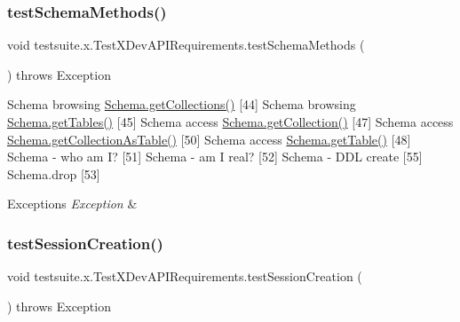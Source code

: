 \subsubsection{\texorpdfstring{test\+Schema\+Methods()}{testSchemaMethods()}}
{\footnotesize\ttfamily void testsuite.\+x.\+Test\+X\+Dev\+A\+P\+I\+Requirements.\+test\+Schema\+Methods (\begin{DoxyParamCaption}{ }\end{DoxyParamCaption}) throws Exception}

Schema browsing \mbox{\hyperlink{interfacecom_1_1mysql_1_1cj_1_1xdevapi_1_1_schema_a644344cb0eaa8ea239f7b82443c487ec}{Schema.\+get\+Collections()}} \mbox{[}44\mbox{]} Schema browsing \mbox{\hyperlink{interfacecom_1_1mysql_1_1cj_1_1xdevapi_1_1_schema_a33149bd057a049634d070e97848b8ca1}{Schema.\+get\+Tables()}} \mbox{[}45\mbox{]} Schema access \mbox{\hyperlink{interfacecom_1_1mysql_1_1cj_1_1xdevapi_1_1_schema_aeb2f782db94fd4a068b1c1e6b9f3f20e}{Schema.\+get\+Collection()}} \mbox{[}47\mbox{]} Schema access \mbox{\hyperlink{interfacecom_1_1mysql_1_1cj_1_1xdevapi_1_1_schema_adaa1920ec971a87acc1173ba0c56f92e}{Schema.\+get\+Collection\+As\+Table()}} \mbox{[}50\mbox{]} Schema access \mbox{\hyperlink{interfacecom_1_1mysql_1_1cj_1_1xdevapi_1_1_schema_a27cf7ad5981483a0e44b6ea795b3e428}{Schema.\+get\+Table()}} \mbox{[}48\mbox{]} Schema -\/ who am I? \mbox{[}51\mbox{]} Schema -\/ am I real? \mbox{[}52\mbox{]} Schema -\/ D\+DL create \mbox{[}55\mbox{]} Schema.\+drop \mbox{[}53\mbox{]}


\begin{DoxyExceptions}{Exceptions}
{\em Exception} & \\
\hline
\end{DoxyExceptions}
\mbox{\label{classtestsuite_1_1x_1_1_test_x_dev_a_p_i_requirements_aa9f988a47feadf60dff0dd5c2007666e}} 
\subsubsection{\texorpdfstring{test\+Session\+Creation()}{testSessionCreation()}}
{\footnotesize\ttfamily void testsuite.\+x.\+Test\+X\+Dev\+A\+P\+I\+Requirements.\+test\+Session\+Creation (\begin{DoxyParamCaption}{ }\end{DoxyParamCaption}) throws Exception}

